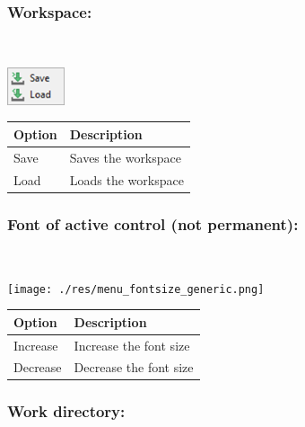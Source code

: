 \hypertarget{menu_r_term_workspace}{}
\subsubsection{Workspace:}\\

\includegraphics[scale=0.8]{./res/menu_r_term_workspace.png}\\

\begin{scriptsize}
  \begin{tabularx}{\textwidth}{>{\hsize=0.3\hsize}X>{\hsize=0.7\hsize}X}\\
    \hline
    \textbf{Option} & \textbf{Description} \\
    \hline
    Save & Saves the workspace \\
    Load & Loads the workspace \\
    \hline
  \end{tabularx}
\end{scriptsize}

\hypertarget{menu_r_term_fontsize}{}
\subsubsection{Font of active control (not permanent):}\\

\texttt{[image: ./res/menu\_fontsize\_generic.png]}\\

\begin{scriptsize}
  \begin{tabularx}{\textwidth}{>{\hsize=0.3\hsize}X>{\hsize=0.7\hsize}X}\\
    \hline
    \textbf{Option} & \textbf{Description} \\
    \hline
    Increase & Increase the font size \\
    Decrease & Decrease the font size \\
    \hline
  \end{tabularx}
\end{scriptsize}

\hypertarget{menu_r_control_workdir}{}
\subsubsection{Work directory:}\\

